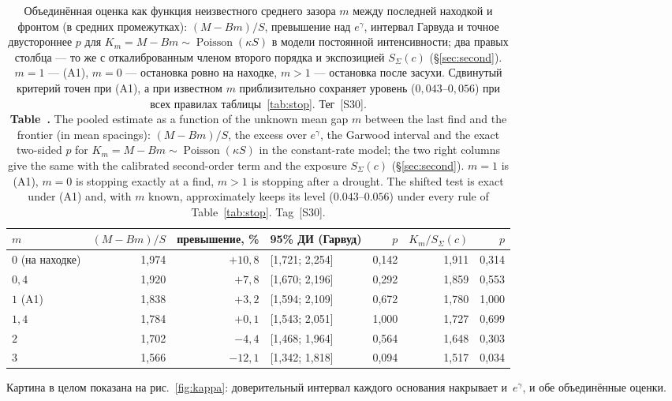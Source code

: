 \documentclass[11pt,a4paper]{article}
\newcommand{\encaptab}[1]{\\[3pt]\foreignlanguage{english}{%
  \textbf{Table~\thetable.} #1}}
\theoremstyle{plain}
\theoremstyle{remark}
\newcommand{\eg}{e^{\gamma}}
\DeclareMathOperator{\Pois}{Poisson}
\begin{document}
\begin{table}[t]
\centering
\caption{Объединённая оценка как функция неизвестного среднего зазора $m$ между
последней находкой и фронтом (в средних промежутках): $(M-Bm)/S$, превышение над
$\eg$, интервал Гарвуда и точное двустороннее $p$ для $K_m=M-Bm\sim\Pois(\kappa S)$
в модели постоянной интенсивности; два правых столбца --- то же с откалиброванным
членом второго порядка и экспозицией $S_\Sigma(c)$ (\S\ref{sec:second}). $m=1$ ---
(A1), $m=0$ --- остановка ровно на находке, $m>1$ --- остановка после засухи.
Сдвинутый критерий точен при (A1), а при известном $m$ приблизительно сохраняет
уровень ($0{,}043$--$0{,}056$) при всех правилах таблицы~\ref{tab:stop}. Тег~[S30].
\encaptab{The pooled estimate as a function of the unknown mean gap $m$ between the
last find and the frontier (in mean spacings): $(M-Bm)/S$, the excess over $\eg$, the
Garwood interval and the exact two-sided $p$ for $K_m=M-Bm\sim\Pois(\kappa S)$ in the
constant-rate model; the two right columns give the same with the calibrated
second-order term and the exposure $S_\Sigma(c)$ (\S\ref{sec:second}). $m=1$ is (A1),
$m=0$ is stopping exactly at a find, $m>1$ is stopping after a drought. The shifted
test is exact under (A1) and, with $m$ known, approximately keeps its level
($0.043$--$0.056$) under every rule of Table~\ref{tab:stop}. Tag~[S30].}}
\label{tab:mfamily}
\small
\begin{tabular}{lrrlrrr}
\toprule
$m$ & $(M-Bm)/S$ & превышение, \% & 95\% ДИ (Гарвуд) & $p$ & $K_m/S_\Sigma(c)$ & $p$\\
\midrule
$0$ (на находке) & 1{,}974 & $+10{,}8$ & [1{,}721; 2{,}254] & 0{,}142 & 1{,}911 & 0{,}314\\
$0{,}4$ & 1{,}920 & $+7{,}8$ & [1{,}670; 2{,}196] & 0{,}292 & 1{,}859 & 0{,}553\\
$1$ (A1) & 1{,}838 & $+3{,}2$ & [1{,}594; 2{,}109] & 0{,}672 & 1{,}780 & 1{,}000\\
$1{,}4$ & 1{,}784 & $+0{,}1$ & [1{,}543; 2{,}051] & 1{,}000 & 1{,}727 & 0{,}699\\
$2$ & 1{,}702 & $-4{,}4$ & [1{,}468; 1{,}964] & 0{,}564 & 1{,}648 & 0{,}303\\
$3$ & 1{,}566 & $-12{,}1$ & [1{,}342; 1{,}818] & 0{,}094 & 1{,}517 & 0{,}034\\
\bottomrule
\end{tabular}
\end{table} Картина в целом
показана на рис.~\ref{fig:kappa}: доверительный интервал каждого основания накрывает
и~$\eg$, и обе объединённые оценки.
\end{document}
